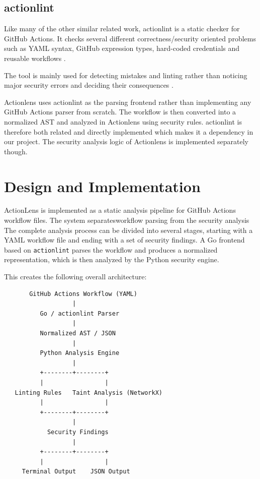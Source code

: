 \documentclass{article}
\begin{document}
\subsection{actionlint}

Like many of the other similar related work, actionlint is a static checker for GitHub Actions. It checks several different correctness/security oriented problems such as YAML syntax, GitHub expression types, hard-coded credentials and reusable workflows \cite{actionlint}. 

The tool is mainly used for detecting mistakes and linting rather than noticing major security errors and deciding their consequences \cite{actionlint}. 

Actionlens uses actionlint as the parsing frontend rather than implementing any GitHub Actions parser from scratch. The workflow is then converted into a normalized AST and analyzed in Actionlens using security rules. actionlint is therefore both related and directly implemented which makes it a dependency in our project. The security analysis logic of Actionlens is implemented separately though. 

\section{Design and Implementation}

ActionLens is implemented as a static analysis pipeline for GitHub Actions workflow files. The system separatesworkflow parsing from the security
analysis The complete analysis process can be divided into several stages, starting with a YAML workflow file and ending with a set of security findings. A Go frontend based on \texttt{actionlint} parses the workflow
and produces a normalized representation, which is then analyzed by the
Python security engine. 

This creates the following overall architecture:

\begin{verbatim}
       GitHub Actions Workflow (YAML)
                   |
          Go / actionlint Parser
                   |
          Normalized AST / JSON
                   |
          Python Analysis Engine
                   |
          +--------+--------+
          |                 |
   Linting Rules   Taint Analysis (NetworkX)
          |                 |
          +--------+--------+
                   |
            Security Findings
                   |
          +--------+--------+
          |                 |
     Terminal Output    JSON Output
\end{verbatim}
\end{document}
